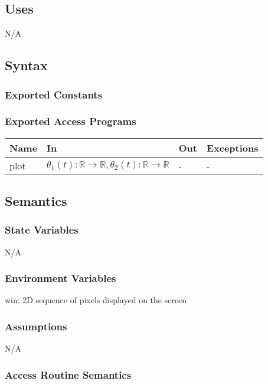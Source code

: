 \documentclass[12pt, titlepage]{article}
\begin{document}
\subsection{Uses}
N/A
\subsection{Syntax}

\subsubsection{Exported Constants}

\subsubsection{Exported Access Programs}
\begin{center}
\begin{tabular}{p{2cm} p{8cm} p{2cm} p{2cm}}
\hline
\textbf{Name} & \textbf{In} & \textbf{Out} & \textbf{Exceptions} \\
\hline
plot & $\theta_1(t):\mathbb{R} \rightarrow \mathbb{R},
                 \theta_2(t):\mathbb{R} \rightarrow \mathbb{R}
                 $ & - & - \\
\hline
\end{tabular}
\end{center}

\subsection{Semantics}

\subsubsection{State Variables}
N/A

\subsubsection{Environment Variables}

win: 2D sequence of pixels displayed on the screen\\

\subsubsection{Assumptions}
N/A
\subsubsection{Access Routine Semantics}
\end{document}
